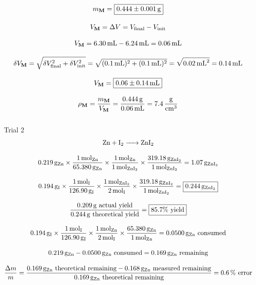 \documentclass[titlepage]{article}
\begin{document}
\begin{gather*}
    m_\textbf{M} = \boxed{0.444 \pm 0.001  \,\si{\gram}} \\[2ex]
    V_\textbf{M} = \Delta V = V_{\mathrm{final}} - V_{\mathrm{init}} \\[2ex]
    V_\textbf{M} = 6.30 \,\si{\milli\liter} - 6.24  \,\si{\milli\liter} = 0.06 \,\si{\milli\liter}\\[2ex]
    \delta V_\textbf{M} = \sqrt{\delta V_{\mathrm{final}}^2+\delta V_{\mathrm{init}}^2} = \sqrt{(\SI{0.1}{\milli\liter})^2+(\SI{0.1}{\milli\liter})^2} = \sqrt{\SI{0.02}{\milli\liter}^2} = \SI{0.14}{\milli\liter} \\[2ex]
    V_\textbf{M} = \boxed{0.06 \pm 0.14 \,\si{\milli\liter}} \\[2ex]
    \rho_\textbf{M} = \frac {m_\textbf{M}}{V_\textbf{M}} = \frac{\SI{0.444}{\gram}}{\SI{0.06}{\milli\liter}} = 7.4 \,\si{\frac{\gram}{{\centi\meter}^3}} \\[2ex] 
\end{gather*}

\large{Trial 2}
\begin{gather*}
    \ce{Zn + I2 -> ZnI2} \\[2ex]
    \SI{0.219}{\gram\of{Zn}}\times\frac{\SI{1}{\mol\of{Zn}}}{\SI{65.380}{\gram\of{Zn}}}\times\frac{\SI{1}{\mol\of{Zn}}}{\SI{1}{\mol\of{\ce{ZnI2}}}}\times\frac{\SI{319.18}{\gram\of{\ce{ZnI2}}}}{\SI{1}{\mol\of{\ce{ZnI2}}}}=\SI{1.07}{\gram\of{\ce{ZnI2}}} \\[2ex]
    \SI{0.194}{\gram\of{I}}\times\frac{\SI{1}{\mol\of{I}}}{\SI{126.90}{\gram\of{I}}}\times\frac{\SI{1}{\mol\of{\ce{ZnI2}}}}{\SI{2}{\mol\of{I}}}\times\frac{\SI{319.18}{\gram\of{\ce{ZnI2}}}}{\SI{1}{\mol\of{\ce{ZnI2}}}}=\boxed{\SI{0.244}{\gram\of{\ce{ZnI2}}}} \\[2ex]
    \frac{\SI{0.209}{\gram}\mathrm{\ actual\ yield}}{\SI{0.244}{\gram}\mathrm{\ theoretical\ yield}}=\boxed{85.7\unit{\percent}\mathrm{\ yield}} \\[2ex]
    \SI{0.194}{\gram\of{I}}\times\frac{\SI{1}{\mol\of{I}}}{\SI{126.90}{\gram\of{I}}}\times\frac{\SI{1}{\mol\of{Zn}}}{\SI{2}{\mol\of{I}}}\times\frac{\SI{65.380}{\gram\of{Zn}}}{\SI{1}{\mol\of{Zn}}}=\SI{0.0500}{\gram\of{Zn}}\text{ consumed} \\[2ex]
    \SI{0.219}{\gram\of{Zn}}-\SI{0.0500}{\gram\of{Zn}}\text{ consumed}=\SI{0.169}{\gram\of{Zn}}\text{ remaining} \\[2ex]
    \frac{\Delta m}{m}=\frac{\SI{0.169}{\gram\of{Zn}}\text{ theoretical remaining}-\SI{0.168}{\gram\of{Zn}}\text{ measured remaining}}{\SI{0.169}{\gram\of{Zn}}\text{ theoretical remaining}}=\SI{0.6}{\percent}\text{ error}
\end{gather*}
\end{document}
